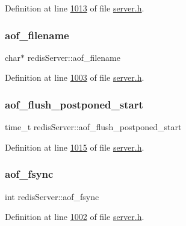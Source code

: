 Definition at line \hyperlink{server_8h_source_l01013}{1013} of file \hyperlink{server_8h_source}{server.\+h}.

\mbox{\label{structredisServer_aa30b4b020b1f8654bd11cdf8e90bad53}} 
\subsubsection{\texorpdfstring{aof\+\_\+filename}{aof\_filename}}
{\footnotesize\ttfamily char$\ast$ redis\+Server\+::aof\+\_\+filename}



Definition at line \hyperlink{server_8h_source_l01003}{1003} of file \hyperlink{server_8h_source}{server.\+h}.

\mbox{\label{structredisServer_abfebb2953462dc122f78e52af3c817ad}} 
\subsubsection{\texorpdfstring{aof\+\_\+flush\+\_\+postponed\+\_\+start}{aof\_flush\_postponed\_start}}
{\footnotesize\ttfamily time\+\_\+t redis\+Server\+::aof\+\_\+flush\+\_\+postponed\+\_\+start}



Definition at line \hyperlink{server_8h_source_l01015}{1015} of file \hyperlink{server_8h_source}{server.\+h}.

\mbox{\label{structredisServer_acf1c107b53e95affc31388b376d27580}} 
\subsubsection{\texorpdfstring{aof\+\_\+fsync}{aof\_fsync}}
{\footnotesize\ttfamily int redis\+Server\+::aof\+\_\+fsync}



Definition at line \hyperlink{server_8h_source_l01002}{1002} of file \hyperlink{server_8h_source}{server.\+h}.

